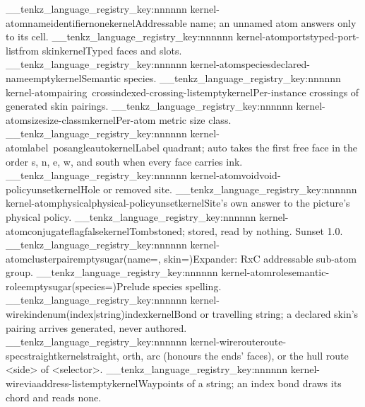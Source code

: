 \__tenkz_language_registry_key:nnnnnn {kernel-atom}{name}{identifier}{none}{kernel}{Addressable name; an unnamed atom answers only to its cell.}
\__tenkz_language_registry_key:nnnnnn {kernel-atom}{ports}{typed-port-list}{from skin}{kernel}{Typed faces and slots.}
\__tenkz_language_registry_key:nnnnnn {kernel-atom}{species}{declared-name}{empty}{kernel}{Semantic species.}
\__tenkz_language_registry_key:nnnnnn {kernel-atom}{pairing~cross}{indexed-crossing-list}{empty}{kernel}{Per-instance crossings of generated skin pairings.}
\__tenkz_language_registry_key:nnnnnn {kernel-atom}{size}{size-class}{m}{kernel}{Per-atom metric size class.}
\__tenkz_language_registry_key:nnnnnn {kernel-atom}{label~pos}{angle}{auto}{kernel}{Label quadrant; auto takes the first free face in the order s, n, e, w, and south when every face carries ink.}
\__tenkz_language_registry_key:nnnnnn {kernel-atom}{void}{void-policy}{unset}{kernel}{Hole or removed site.}
\__tenkz_language_registry_key:nnnnnn {kernel-atom}{physical}{physical-policy}{unset}{kernel}{Site's own answer to the picture's physical policy.}
\__tenkz_language_registry_key:nnnnnn {kernel-atom}{conjugate}{flag}{false}{kernel}{Tombstoned; stored, read by nothing. Sunset 1.0.}
\__tenkz_language_registry_key:nnnnnn {kernel-atom}{cluster}{pair}{empty}{sugar(name=, skin=)}{Expander: RxC addressable sub-atom group.}
\__tenkz_language_registry_key:nnnnnn {kernel-atom}{role}{semantic-role}{empty}{sugar(species=)}{Prelude species spelling.}
\__tenkz_language_registry_key:nnnnnn {kernel-wire}{kind}{enum(index|string)}{index}{kernel}{Bond or travelling string; a declared skin's pairing arrives generated, never authored.}
\__tenkz_language_registry_key:nnnnnn {kernel-wire}{route}{route-spec}{straight}{kernel}{straight, orth, arc (honours the ends' faces), or the hull route {<side> of <selector>}.}
\__tenkz_language_registry_key:nnnnnn {kernel-wire}{via}{address-list}{empty}{kernel}{Waypoints of a string; an index bond draws its chord and reads none.}
